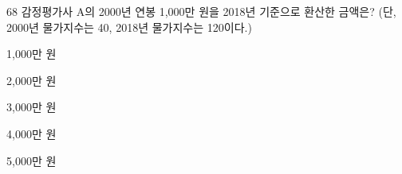 \begin{question}{68}
감정평가사 A의 2000년 연봉 1,000만 원을 2018년 기준으로 환산한 금액은? (단, 2000년 물가지수는 40, 2018년 물가지수는 120이다.)
\begin{choices}
  \item 1,000만 원
  \item 2,000만 원
  \item 3,000만 원
  \item 4,000만 원
  \item 5,000만 원
\end{choices}
\end{question}

